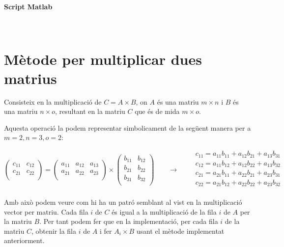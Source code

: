 \documentclass[11pt,a4paper,twoside]{report}
\begin{document}
\paragraph*{Script Matlab} \mbox{} \\



\section{Mètode per multiplicar dues matrius}

Consisteix en la multiplicació de $C = A \times B$, on $A$ és una matriu $m \times n$ i $B$ és una matriu $n \times o$, resultant en la matriu $C$ que és de mida $m \times o$. 

Aquesta operació la podem representar simbolicament de la següent manera per a $m = 2, n = 3, o = 2$: 

\[
\begin{pmatrix}
		  	c_{11}	&	c_{12}	\\
		  	c_{21}	&	c_{22}	\\
\end{pmatrix} = 
 	\begin{pmatrix}
		  	a_{11}	&	a_{12} & a_{13}\\
		  	a_{21}	&	a_{22} & a_{23}\\
\end{pmatrix} \times
 	\begin{pmatrix}
		  	b_{11}	&	b_{12}	\\
		  	b_{21}	&	b_{22}	\\
		  	b_{31}	&	b_{32}	\\
\end{pmatrix} \qquad \longrightarrow \qquad
 \begin{matrix} 
 c_{11} = a_{11}b_{11} + a_{12}b_{21} + a_{13}b_{31} \\
 c_{12} = a_{11}b_{12} + a_{12}b_{22} + a_{13}b_{32} \\
 c_{21} = a_{21}b_{11} + a_{22}b_{21} + a_{23}b_{31}	\\
 c_{22} = a_{21}b_{12} + a_{22}b_{22} + a_{23}b_{32} \\
 \end{matrix}
\]

Amb això podem veure com hi ha un patró semblant al vist en la multiplicació vector per matriu. Cada fila $i$ de $C$ és igual a la multiplicació de la fila $i$ de $A$ per la matriu $B$. Per tant podem fer que en la implementació, per cada fila $i$ de la matriu $C$, obtenir la fila $i$ de $A$ i fer $A_i \times B$ usant el mètode implementat anteriorment.
\end{document}
